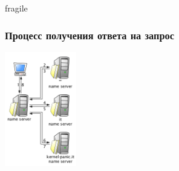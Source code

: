 \begin{frame}{fragile}
  \frametitle{Процесс получения ответа на запрос}
\begin{center}
  \includegraphics[height=5cm]{../../slides/dns/images/resolvprocess.png}
\end{center}
\end{frame}